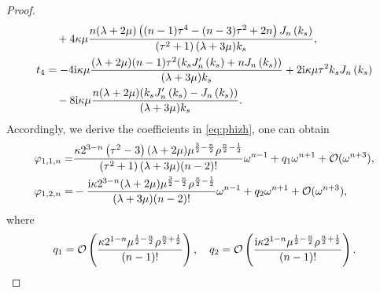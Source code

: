 \documentclass[11pt,reqno,twoside]{amsart}
\theoremstyle{definition}
\theoremstyle{remark}
\numberwithin{equation}{section}
\begin{document}
\begin{proof}
\begin{align}
		&\quad +4 \kappa\mu  \frac{  n (\lambda +2 \mu ) \left((n-1) \tau ^4-(n-3) \tau ^2+2 n\right) J_n\left(k_s\right)}{\left(\tau ^2+1\right) (\lambda +3 \mu ) k_s},\notag\\
		t_{4}&=-4 \mathrm{i} \kappa \mu  \frac{  (\lambda +2 \mu ) (n-1) \tau ^2(k_sJ_n'\left(k_s\right)+nJ_n\left(k_s\right)) }{(\lambda +3 \mu ) k_s}+2 \mathrm{i} \kappa \mu  \tau ^2  k_s J_n\left(k_s\right)\notag\\
		&\quad-8 \mathrm{i} \kappa \mu  \frac{ n (\lambda +2 \mu ) (k_sJ_n'\left(k_s\right)-J_n\left(k_s\right))}{(\lambda +3 \mu ) k_s}.\notag
	\end{align}
	Accordingly, we derive the coefficients in \eqref{eq:phizh}, one can obtain 
	\begin{align}
		\varphi _{1,1,n}=&\frac{\kappa 2^{3-n} \left(\tau ^2-3\right) (\lambda +2 \mu ) \mu ^{\frac{3}{2}-\frac{n}{2}} \rho ^{\frac{n}{2}-\frac{1}{2}}}{\left(\tau ^2+1\right) (\lambda +3 \mu ) (n-2)!}\omega ^{n-1}+q_{1}\omega ^{n+1}+ \mathcal{O}(\omega^{n+3}),\label{eq:x12} \\
		\varphi _{1,2,n}=&-\frac{\mathrm{i} \kappa 2^{3-n} (\lambda +2 \mu ) \mu ^{\frac{3}{2}-\frac{n}{2}} \rho ^{\frac{n}{2}-\frac{1}{2}}}{(\lambda +3 \mu ) (n-2)!}\omega ^{n-1}+q_{2}\omega ^{n+1}+ \mathcal{O}(\omega^{n+3}),\notag
	\end{align}
	where
	\begin{align}\notag
		q_{1}=\mathcal{O}\left(\frac{\kappa 2^{1-n}  \mu ^{\frac{1}{2}-\frac{n}{2}} \rho ^{\frac{n}{2}+\frac{1}{2}}}{(n-1)!}\right),\quad q_{2}=\mathcal{O}\left(\frac{\mathrm{i} \kappa 2^{1-n}  \mu ^{\frac{1}{2}-\frac{n}{2}} \rho ^{\frac{n}{2}+\frac{1}{2}}}{(n-1)!}\right).
	\end{align}
	

\end{proof}
\end{document}

